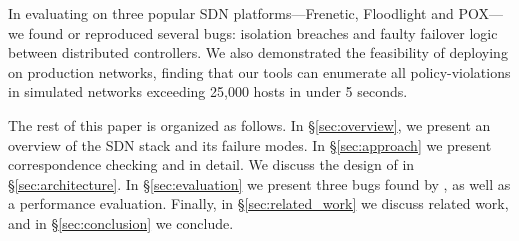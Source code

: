 In evaluating \projectname{} on
three popular SDN platforms---Frenetic, Floodlight and POX---we found or reproduced several bugs:
isolation breaches and faulty failover logic between distributed controllers.
We also demonstrated the feasibility of deploying
\projectname{} on production networks,
finding that our tools can enumerate all policy-violations in
simulated networks exceeding 25,000 hosts in under 5 seconds.

The rest of this paper is organized as follows. In \S\ref{sec:overview},
we present an overview of the SDN stack and its failure modes.
In \S\ref{sec:approach} we present correspondence checking and
\simulator{} in detail. We discuss the design of \projectname{} in
\S\ref{sec:architecture}. In \S\ref{sec:evaluation} we present
three bugs found by \projectname{}, as well as a performance evaluation.
Finally, in \S\ref{sec:related_work} we discuss related work,
and in \S\ref{sec:conclusion} we conclude.

